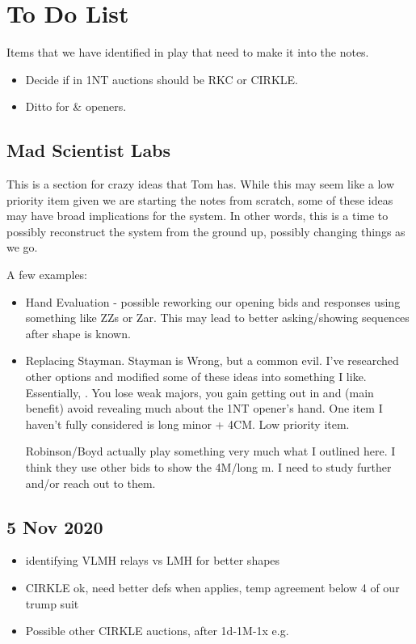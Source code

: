 \documentclass[tom-ari]{subfile}
\begin{document}
	
	\chapter{To Do List}
	
	Items that we have identified in play that need to make it into the notes.
	\begin{itemize}
		\item Decide if  in 1NT auctions should be RKC or CIRKLE. 
		\item Ditto for  \&  openers.
	\end{itemize}

	\section{Mad Scientist Labs}
	
	This is a section for crazy ideas that Tom has.  While this may seem like a low priority item given we are starting the notes from scratch, some of these ideas may have broad implications for the system.  In other words, this is a time to possibly reconstruct the system from the ground up, possibly changing things as we go.
	
	A few examples:
	
	\begin{itemize}
		\item Hand Evaluation - possible reworking our opening bids and responses using something like ZZs or Zar.  This may lead to better asking/showing sequences after shape is known.
		\item Replacing Stayman.  Stayman is Wrong, but a common evil.  I've researched other options and modified some of these ideas into something I like.  Essentially, \rightarrow{}.  You lose weak majors, you gain getting out in  and (main benefit) avoid revealing much about the 1NT opener's hand.  One item I haven't fully considered is long minor + 4CM.  Low priority item.
		
		 Robinson/Boyd actually play something very much what I outlined here.  I think they use other bids to show the 4M/long m.  I need to study further and/or reach out to them.
	\end{itemize}

	\section{5 Nov 2020}
	\begin{itemize}
		\item identifying VLMH relays vs LMH for better shapes
		\item CIRKLE ok, need better defs when applies, temp agreement below 4 of our trump suit
		\item Possible other CIRKLE auctions, after 1d-1M-1x e.g.
	\end{itemize}
\end{document}
